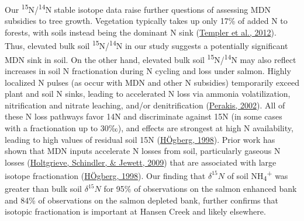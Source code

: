 \documentclass [11pt, proquest] {uwthesis}[2015/03/03]
\begin{document}
Our \textsuperscript{15}N/\textsuperscript{14}N stable isotope data raise further questions of assessing MDN subsidies to tree growth. Vegetation typically takes up only 17\% of added N to forests, with soils instead being the dominant N sink (\protect\hyperlink{ref-Templer2012}{Templer et al., 2012}). Thus, elevated bulk soil \textsuperscript{15}N/\textsuperscript{14}N in our study suggests a potentially significant MDN sink in soil. On the other hand, elevated bulk soil \textsuperscript{15}N/\textsuperscript{14}N may also reflect increases in soil N fractionation during N cycling and loss under salmon. Highly localized N pulses (as occur with MDN and other N subsidies) temporarily exceed plant and soil N sinks, leading to accelerated N loss via ammonia volatilization, nitrification and nitrate leaching, and/or denitrification (\protect\hyperlink{ref-Perakis2002}{Perakis, 2002}). All of these N loss pathways favor 14N and discriminate against 15N (in some cases with a fractionation up to 30‰), and effects are strongest at high N availability, leading to high values of residual soil 15N (\protect\hyperlink{ref-Hogberg1998}{HÖgberg, 1998}). Prior work has shown that MDN inputs accelerate N losses from soil, particularly gaseous N losses (\protect\hyperlink{ref-Holtgrieve2009}{Holtgrieve, Schindler, \& Jewett, 2009}) that are associated with large isotope fractionation (\protect\hyperlink{ref-Hogberg1998}{HÖgberg, 1998}). Our finding that \(\delta^{15}N\) of soil NH\textsubscript{4}\textsuperscript{+} was greater than bulk soil \(\delta^{15}N\) for 95\% of observations on the salmon enhanced bank and 84\% of observations on the salmon depleted bank, further confirms that isotopic fractionation is important at Hansen Creek and likely elsewhere.
\end{document}
